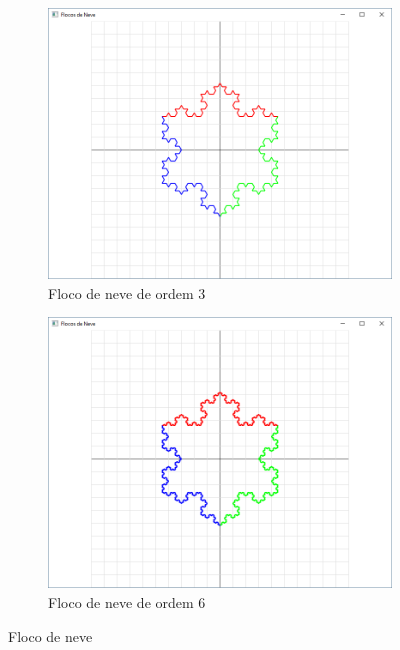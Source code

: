 \begin{enumerate}
\begin{enumerate}
\begin{figure}[!htp]
\begin{subfigure}[t]{0.4\textwidth}
              \centerline{\includegraphics[width=.9\textwidth]{img/cap4_ex15c}}
              \caption{Floco de neve de ordem $3$}
              \label{fig:cap04_ex15c}
          \end{subfigure}
          \hfill
          \begin{subfigure}[t]{0.4\textwidth}
              \centerline{\includegraphics[width=.9\textwidth]{img/cap4_ex15d}}
              \caption{Floco de neve de ordem $6$}
              \label{fig:cap04_ex15d}
          \end{subfigure}

          \caption{
            \label{fig:flocos}%
            Floco de neve
          }

        \end{figure}
    \end{enumerate}


\end{enumerate}
